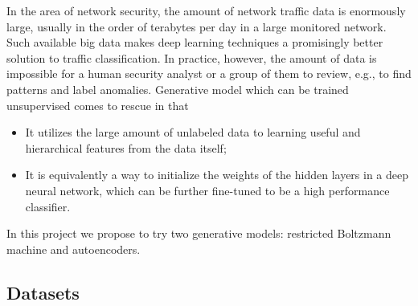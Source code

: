 In the area of network security, the amount of network traffic data is enormously large,
usually in the order of terabytes per day in a large monitored network.
Such available big data makes deep learning techniques a promisingly better solution
to traffic classification.
In practice, however, the amount of data is impossible for a human security analyst or
a group of them to review, e.g., to find patterns and label anomalies.
Generative model which can be trained unsupervised comes to rescue in that
\begin{itemize}
    \item It utilizes the large amount of unlabeled data to learning useful and hierarchical features
        from the data itself;
    \item It is equivalently a way to initialize the weights of the hidden layers
        in a deep neural network, which can be further fine-tuned to be a high performance classifier.
\end{itemize}
In this project we propose to try two generative models: restricted Boltzmann machine and autoencoders.

\subsection{Datasets}


